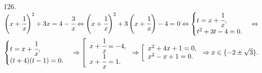 126. $\left(x+\cfrac{1}{x}\right)^2+3x=4-\cfrac{3}{x}\Leftrightarrow \left(x+\cfrac{1}{x}\right)^2+3\left(x+\cfrac{1}{x}\right)-4=0\Leftrightarrow
\begin{cases} t=x+\cfrac{1}{x},\\ t^2+3t-4=0.\end{cases}\Leftrightarrow$\\$
\begin{cases} t=x+\cfrac{1}{x},\\ (t+4)(t-1)=0.\end{cases}\Rightarrow \left[\begin{array}{l} x+\cfrac{1}{x}=-4,\\ x+\cfrac{1}{x}=1.\end{array}\right.
\Rightarrow \left[\begin{array}{l} x^2+4x+1=0,\\ x^2-x+1=0.\end{array}\right.\Rightarrow x\in\{-2\pm\sqrt{3}\}.$\\
